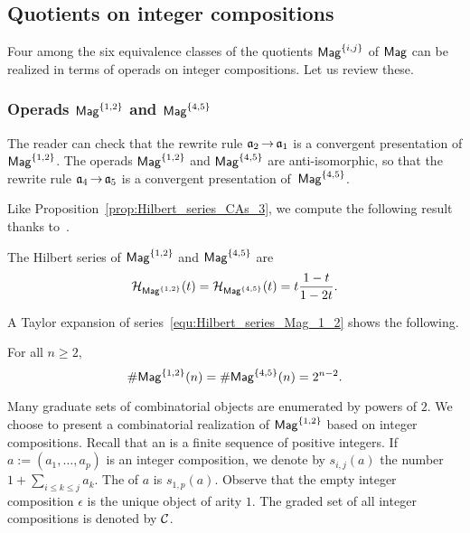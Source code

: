 \subsection{Quotients on integer compositions}
Four among the six equivalence classes of the quotients
$\mathsf{Mag}^{\{i, j\}}$ of $\mathsf{Mag}$ can be realized in terms of operads on
integer compositions. Let us review these.
\medbreak

\subsubsection{Operads $\mathsf{Mag}^{\{1, 2\}}$ and $\mathsf{Mag}^{\{4, 5\}}$}
\label{subsubsec:Mag_1_2}
The reader can check that the rewrite rule $\mathfrak{a}_2 \operatorname{\to} \mathfrak{a}_1$ is a
convergent presentation of $\mathsf{Mag}^{\{1, 2\}}$. The operads
$\mathsf{Mag}^{\{1, 2\}}$ and $\mathsf{Mag}^{\{4, 5\}}$ are anti-isomorphic, so that the
rewrite rule $\mathfrak{a}_4 \operatorname{\to} \mathfrak{a}_5$ is a convergent presentation
of~$\mathsf{Mag}^{\{4, 5\}}$.
\medbreak

Like Proposition~\ref{prop:Hilbert_series_CAs_3}, we compute the
following result thanks to~\cite{Gir18}.

\begin{Theorem} \label{thm:Hilbert_series_Mag_1_2}
    The Hilbert series of $\mathsf{Mag}^{\{1, 2\}}$ and $\mathsf{Mag}^{\{4, 5\}}$ are
    \begin{equation} \label{equ:Hilbert_series_Mag_1_2}
        \mathcal{H}_{\mathsf{Mag}^{\{1, 2\}}}(t)
        = \mathcal{H}_{\mathsf{Mag}^{\{4, 5\}}}(t) =
        t \frac{1 - t}{1 - 2t}.
    \end{equation}
\end{Theorem}
\medbreak

A Taylor expansion of series~\eqref{equ:Hilbert_series_Mag_1_2} shows
the following.
\medbreak

\begin{Proposition} \label{prop:Close_formula_Mag_1_2}
    For all $n \geq 2,$
    \begin{equation} \label{equ:Close_formula_Mag_1_2}
        \# \mathsf{Mag}^{\{1, 2\}}(n) = \# \mathsf{Mag}^{\{4, 5\}}(n) = 2^{n-2}.
    \end{equation}
\end{Proposition}
\medbreak

Many graduate sets of combinatorial objects are enumerated by powers of
$2$. We choose to present a combinatorial realization of 
$\mathsf{Mag}^{\{1, 2\}}$ based on
integer compositions. Recall that an  is a
finite sequence of positive integers. If
$a := \left(a_1, \dots, a_p\right)$ is an integer composition, we denote
by $s_{i, j}(a)$ the number $1 + \sum_{i \leq k \leq j} a_k$. The
 of $a$ is $s_{1, p}(a)$. Observe that the empty integer
composition $\epsilon$ is the unique object of arity $1$. The graded set
of all integer compositions is denoted by $\mathcal{C}$.
\medbreak

